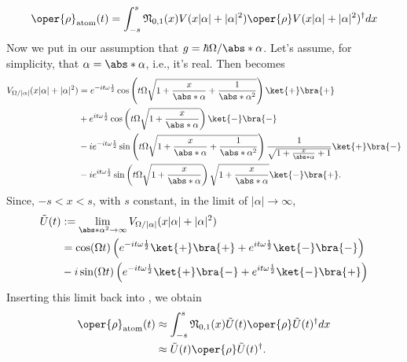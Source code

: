\begin{equation}
    \label{eq:appen_JCM_rho_atom_t}
    \begin{aligned}
        \oper{\rho}_{\text{atom}}(t)= \int_{-s}^{s} \mathfrak{N}_{0, 1}(x) V(x|\alpha| + |\alpha|^2) 
    \oper{\rho} V(x|\alpha| + |\alpha|^2)^{\dagger} dx
    \end{aligned}
\end{equation}
Now we put in our assumption that \(g = \hbar\Omega / \abs*{\alpha}\). Let's assume, 
for simplicity, that \(\alpha = \abs*{\alpha}\), i.e., it's real. Then  becomes
\begin{align}
    V_{\Omega/|\alpha|}(x|\alpha| + |\alpha|^2) 
    &= e^{-i t \omega \frac{1}{2}}\cos \left( t\Omega \sqrt{1 + \frac{x}{\abs*{\alpha}}+ \frac{1}{\abs*{\alpha}^2}} \right) \ket{+}\bra{+} \nonumber \\
    &+ e^{i t \omega \frac{1}{2} }\cos \left( t\Omega \sqrt{1 + \frac{x}{\abs*{\alpha}}} \right) \ket{-}\bra{-} \nonumber \\
    &- i e^{-i t \omega \frac{1}{2} }\sin \left( t\Omega \sqrt{1 + \frac{x}{\abs*{\alpha}} + \frac{1}{\abs*{\alpha}^2}} \right) \frac{1}{\sqrt{1 + \frac{x}{\abs*{\alpha}} + 1}} \ket{+}\bra{-} \nonumber \\
    &- i e^{i t \omega \frac{1}{2}} \sin \left( t\Omega \sqrt{1 + \frac{x}{\abs*{\alpha}}} \right) \sqrt{1 + \frac{x}{\abs*{\alpha}}} \ket{-}\bra{+}. \nonumber
\end{align}
Since, \(-s < x < s\), with \(s\) constant, in the limit of \(|\alpha| \to \infty\),
\begin{align}
        \label{eq:appen_JCM_V_g_limit}
    \tilde{U}(t) &:= \lim_{\abs*{\alpha}^2 \to \infty} 
    V_{\Omega/|\alpha|}(x|\alpha| + |\alpha|^2)  \nonumber \\
    &= \cos(\Omega t) \left(e^{-i t \omega \frac{1}{2}}\ket{+}\bra{+} + 
    e^{i t \omega \frac{1}{2}}\ket{-}\bra{-} \right)  \nonumber \\
    &- i \sin(\Omega t)
     \left( e^{-i t \omega \frac{1}{2}}\ket{+}\bra{-}
    + e^{i t \omega \frac{1}{2}}\ket{-}\bra{+}\right)  \nonumber \\
\end{align}
Inserting this limit back into , we obtain
\begin{align}
    \oper{\rho}_{\text{atom}}(t) &\approx \int_{-s}^{s} \mathfrak{N}_{0, 1}(x) \tilde{U}(t) \oper{\rho} \tilde{U}(t)^{\dagger} dx \nonumber\\
        &\approx \tilde{U}(t) \oper{\rho} \tilde{U}(t)^{\dagger}.
\end{align}
